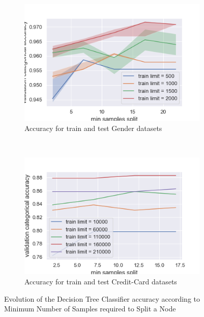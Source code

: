 \documentclass[10pt]{article}
\begin{document}
		\begin{figure}[]
			\centering
			\begin{subfigure}[]{0.45\columnwidth}
				\centering
				\includegraphics[width=\linewidth]{../graphics/tree_gender_min_samples_split_score_type_train_limit.png}
				\caption{Accuracy for train and test Gender datasets}
				\label{tree:tree_gender_min_samples_split_score_type_train_limit}
			\end{subfigure}
			~
			\begin{subfigure}[]{0.45\columnwidth}
				\centering
				\includegraphics[width=\linewidth]{../graphics/tree_creditcard_min_samples_split_score_type_train_limit.png}
				\caption{Accuracy for train and test Credit-Card datasets}
				\label{tree:tree_creditcard_min_samples_split_score_type_train_limit}
			\end{subfigure}
			\caption{Evolution of the Decision Tree Classifier accuracy according to Minimum Number of Samples required to Split a Node}
			\label{tree:min_samples_split_score_type_score_type}
		\end{figure}
\end{document}
